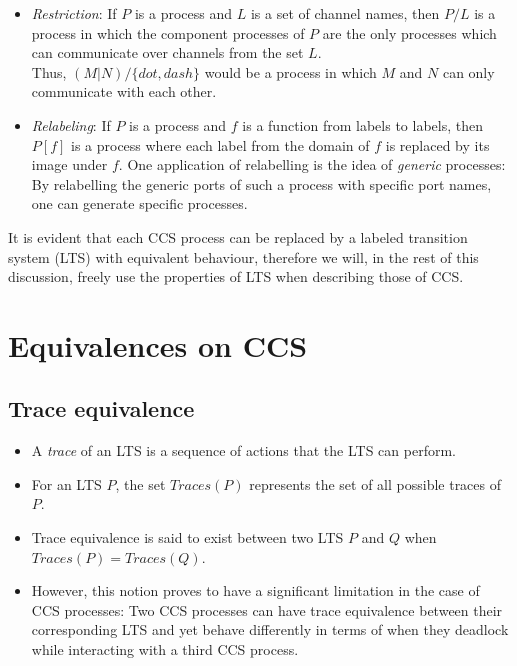 \documentclass{article}
\begin{document}
\begin{itemize}
\item \emph{Restriction}: If $P$ is a process and $L$ is a set of
  channel names, then $P/L$ is a process in which the component
  processes of $P$
  are the only processes which can communicate over channels from the
  set $L$.\\
  Thus, $(M|N)/\{dot,dash\}$ would be a process in which $M$ and $N$
  can only communicate with each other.

\item \emph{Relabeling}: If $P$ is a process and $f$ is a function
  from labels to labels, then $P[f]$ is a process where each label
  from the domain of $f$ is replaced by its image under $f$. One
  application of relabelling is the idea of \emph{generic} processes:
  By relabelling the generic ports of such a process with specific
  port names, one can generate specific processes.

\end{itemize}

It is evident that each CCS process can be replaced by a labeled
transition system (LTS) with equivalent behaviour, therefore we will,
in the rest of this discussion, freely use the properties of LTS when
describing those of CCS.

\section{Equivalences on CCS}

\subsection{Trace equivalence}
  \begin{itemize}

  \item A \emph{trace} of an LTS is a sequence of actions
    that the LTS can perform.

  \item For an LTS $P$, the set $Traces(P)$ represents the set of all
    possible traces of $P$.
  \item Trace equivalence is said to exist between two LTS $P$ and $Q$
    when $Traces(P) = Traces(Q)$.
  \item However, this notion proves to have a significant limitation
    in the case of CCS processes: Two CCS processes can have trace equivalence
    between their corresponding LTS and yet behave differently in
    terms of when they deadlock while interacting with a third CCS process.
  \end{itemize}
\end{document}
